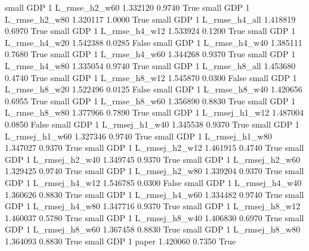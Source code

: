      small      GDP                 1  L_rmse_h2_w60   1.332120      0.9740    True
     small      GDP                 1  L_rmse_h2_w80   1.320117      1.0000    True
     small      GDP                 1  L_rmse_h4_all   1.418819      0.6970    True
     small      GDP                 1  L_rmse_h4_w12   1.533924      0.1200    True
     small      GDP                 1  L_rmse_h4_w20   1.542388      0.0285   False
     small      GDP                 1  L_rmse_h4_w40   1.385111      0.7680    True
     small      GDP                 1  L_rmse_h4_w60   1.344268      0.9370    True
     small      GDP                 1  L_rmse_h4_w80   1.335054      0.9740    True
     small      GDP                 1  L_rmse_h8_all   1.453680      0.4740    True
     small      GDP                 1  L_rmse_h8_w12   1.545870      0.0300   False
     small      GDP                 1  L_rmse_h8_w20   1.522496      0.0125   False
     small      GDP                 1  L_rmse_h8_w40   1.420656      0.6955    True
     small      GDP                 1  L_rmse_h8_w60   1.356890      0.8830    True
     small      GDP                 1  L_rmse_h8_w80   1.377966      0.7890    True
     small      GDP                 1 L_rmsej_h1_w12   1.487004      0.0850   False
     small      GDP                 1 L_rmsej_h1_w40   1.345538      0.9370    True
     small      GDP                 1 L_rmsej_h1_w60   1.327346      0.9740    True
     small      GDP                 1 L_rmsej_h1_w80   1.347027      0.9370    True
     small      GDP                 1 L_rmsej_h2_w12   1.461915      0.4740    True
     small      GDP                 1 L_rmsej_h2_w40   1.349745      0.9370    True
     small      GDP                 1 L_rmsej_h2_w60   1.329425      0.9740    True
     small      GDP                 1 L_rmsej_h2_w80   1.339204      0.9370    True
     small      GDP                 1 L_rmsej_h4_w12   1.546785      0.0300   False
     small      GDP                 1 L_rmsej_h4_w40   1.360626      0.8830    True
     small      GDP                 1 L_rmsej_h4_w60   1.334482      0.9740    True
     small      GDP                 1 L_rmsej_h4_w80   1.347716      0.9370    True
     small      GDP                 1 L_rmsej_h8_w12   1.460037      0.5780    True
     small      GDP                 1 L_rmsej_h8_w40   1.406830      0.6970    True
     small      GDP                 1 L_rmsej_h8_w60   1.367458      0.8830    True
     small      GDP                 1 L_rmsej_h8_w80   1.364093      0.8830    True
     small      GDP                 1          paper   1.420060      0.7350    True
